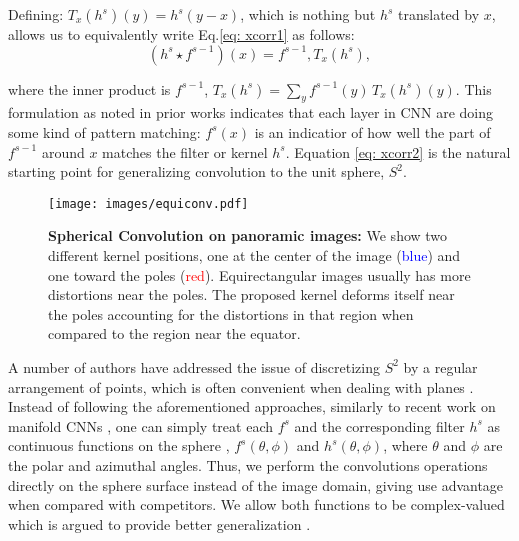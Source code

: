 \documentclass[final]{cvpr}
\newcommand{\nnl}{s}
\newcommand{\fell}{f^{\nnl}}
\newcommand{\fellm}{f^{\nnl-1}}
\newcommand{\chiell}{h^{\nnl}}
\begin{document}
Defining: $T_x(\chiell)(y)=\chiell(y-x)$, which is  
nothing but ${\chiell}$ translated by ${x}$, allows us to equivalently write  Eq.\ref{eq: xcorr1} as follows:
\begin{equation}\label{eq: xcorr2}
(\chiell \star \fellm)(x)=\fellm,T_x(\chiell), 
\end{equation}

where the inner product is $\fellm$,  $T_x(\chiell)=\sum_{y} \fellm(y)\,T_x(\chiell)(y).$
This formulation as noted in prior works indicates that each layer in CNN are doing some kind of pattern matching: 
${\fell(x)}$ is an indicatior of how well the part of ${\fellm}$ around ${x}$ matches the filter or kernel ${\chiell}$. Equation \ref{eq: xcorr2} is the natural starting point for generalizing
convolution to the unit sphere, ${S^2}$.


\begin{figure}[!t]
    \centering
    \texttt{[image: images/equiconv.pdf]}
    \caption{\textbf{Spherical Convolution on panoramic images:} We show two different kernel positions, one at the center of the image (\textcolor{blue}{blue}) and one toward the poles (\textcolor{red}{red}). Equirectangular images usually has more distortions near the poles. The proposed kernel deforms itself near the poles accounting for the distortions in that region when compared to the region near the equator.
}
    \label{fig:equiconv}
\end{figure}



A number of authors have addressed the issue of discretizing ${S^2}$ by a regular arrangement of points, which is often convenient when dealing with planes  \cite{boomsma2017spherical,su2017learning}. 
Instead of following the aforementioned approaches, similarly to recent work on manifold CNNs 
\cite{masci2015geodesic,monti2017geometric}, 
one can simply treat each ${\fell}$ and the corresponding filter ${\chiell}$ 
as continuous functions on the sphere \cite{kondor2018clebschgordan}, ${\fell(\theta,\phi)}$ and ${\chiell(\theta,\phi)}$, 
where ${\theta}$ and ${\phi}$ are the polar and azimuthal angles. 
Thus, we perform the convolutions operations directly on the sphere surface instead of the image domain, giving use advantage when compared with competitors.
We allow both functions to be complex-valued which is argued to provide better generalization \cite{kondor2018clebschgordan}.
\end{document}
